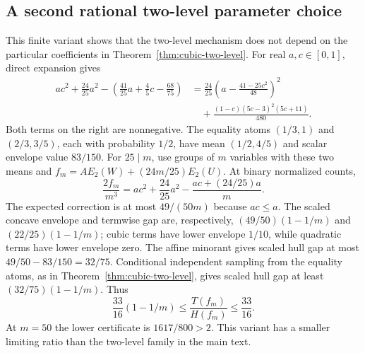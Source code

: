 \subsection{A second rational two-level parameter choice}
\label{app:two-level-variant}
This finite variant shows that the two-level mechanism does not depend
on the particular coefficients in Theorem~\ref{thm:cubic-two-level}.
For real $a,c\in[0,1]$, direct expansion gives
\begin{equation}\label{eq:two-level-variant-scalar}
\begin{aligned}
 ac^2+\frac{24}{25}a^2
 -\left(\frac{41}{25}a+\frac45c-\frac{68}{75}\right)
 &=\frac{24}{25}\left(a-\frac{41-25c^2}{48}\right)^2\\
 &\quad+\frac{(1-c)(5c-3)^2(5c+11)}{480}.
\end{aligned}
\end{equation}
Both terms on the right are nonnegative. The equality atoms
$(1/3,1)$ and $(2/3,3/5)$, each with probability $1/2$, have mean
$(1/2,4/5)$ and scalar envelope value $83/150$.
For $25\mid m$, use groups of $m$ variables with these two means and
$f_m=A E_2(W)+(24m/25)E_2(U)$. At binary normalized counts,
\[
 \frac{2f_m}{m^3}=ac^2+\frac{24}{25}a^2
                   -\frac{ac+(24/25)a}{m}.
\]
The expected correction is at most $49/(50m)$ because $ac\le a$.
The scaled concave envelope and termwise gap are, respectively,
$(49/50)(1-1/m)$ and $(22/25)(1-1/m)$; cubic terms have lower envelope
$1/10$, while quadratic terms have lower envelope zero. The affine
minorant gives scaled hull gap at most $49/50-83/150=32/75$.
Conditional independent sampling from the equality atoms, as in
Theorem~\ref{thm:cubic-two-level}, gives scaled hull gap at least
$(32/75)(1-1/m)$. Thus
\[
 \frac{33}{16}(1-1/m)\le\frac{T(f_m)}{H(f_m)}\le\frac{33}{16}.
\]
At $m=50$ the lower certificate is $1617/800>2$. This variant has a
smaller limiting ratio than the two-level family in the main text.
